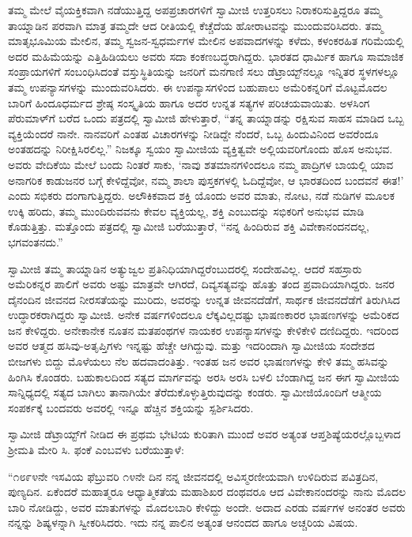 ತಮ್ಮ ಮೇಲೆ ವೈಯಕ್ತಿಕವಾಗಿ ನಡೆಯುತ್ತಿದ್ದ ಅಪಪ್ರಚಾರಗಳಿಗೆ ಸ್ವಾಮೀಜಿ ಉತ್ತರಿಸಲು ನಿರಾಕರಿಸುತ್ತಿದ್ದರೂ ತಮ್ಮ ತಾಯ್ನಾಡಿನ ಪರವಾಗಿ ಮಾತ್ರ ತಮ್ಮದೇ ಆದ ರೀತಿಯಲ್ಲಿ ಕೆಚ್ಚೆದೆಯ ಹೋರಾಟವನ್ನು ಮುಂದುವರಿಸಿದರು. ತಮ್ಮ ಮಾತೃಭೂಮಿಯ ಮೇಲಿನ, ತಮ್ಮ ಸ್ವಜನ-ಸ್ವಧರ್ಮಗಳ ಮೇಲಿನ ಅಪವಾದಗಳನ್ನು ಕಳೆದು, ಕಳಂಕರಹಿತ ಗರಿಮೆಯಲ್ಲಿ ಅದರ ಮಹಿಮೆಯನ್ನು ಎತ್ತಿಹಿಡಿಯಲು ಅವರು ಸದಾ ಕಂಕಣಬದ್ಧರಾಗಿದ್ದರು. ಭಾರತದ ಧಾರ್ಮಿಕ ಹಾಗೂ ಸಾಮಾಜಿಕ ಸಂಪ್ರಾಯಗಳಿಗೆ ಸಂಬಂಧಿಸಿದಂತೆ ವಸ್ತುಸ್ಥಿತಿಯನ್ನು ಜನರಿಗೆ ಮನಗಾಣಿ ಸಲು ಡೆಟ್ರಾಯ್ಟ್​ನಲ್ಲೂ ಇನ್ನಿತರ ಸ್ಥಳಗಳಲ್ಲೂ ತಮ್ಮ ಉಪನ್ಯಾಸಗಳನ್ನು ಮುಂದುವರಿಸಿದರು. ಈ ಉಪನ್ಯಾಸಗಳಿಂದ ಬಹುಪಾಲು ಅಮೆರಿಕನ್ನರಿಗೆ ಮೊಟ್ಟಮೊದಲ ಬಾರಿಗೆ ಹಿಂದೂಧರ್ಮದ ಶ್ರೇಷ್ಠ ಸಂಸ್ಕೃತಿಯ ಹಾಗೂ ಅದರ ಉನ್ನತ ಸತ್ಯಗಳ ಪರಿಚಯವಾಯಿತು. ಅಳಸಿಂಗ ಪೆರುಮಾಳ್​ಗೆ ಬರೆದ ಒಂದು ಪತ್ರದಲ್ಲಿ ಸ್ವಾಮೀಜಿ ಹೇಳುತ್ತಾರೆ, “ತನ್ನ ತಾಯ್ನಾಡನ್ನು ರಕ್ಷಿಸುವ ಸಾಹಸ ಮಾಡಿದ ಒಬ್ಬ ವ್ಯಕ್ತಿಯೆಂದರೆ ನಾನೇ. ನಾನವರಿಗೆ ಎಂತಹ ವಿಚಾರಗಳನ್ನು ನೀಡಿದ್ದೇ ನೆಂದರೆ, ಒಬ್ಬ ಹಿಂದುವಿನಿಂದ ಅವರೆಂದೂ ಅಂತಹದನ್ನು ನಿರೀಕ್ಷಿಸಿರಲಿಲ್ಲ.” ನಿಜಕ್ಕೂ ಸ್ವಯಂ ಸ್ವಾಮೀಜಿಯ ವ್ಯಕ್ತಿತ್ವವೇ ಅಲ್ಲಿಯವರಿಗೊಂದು ಹೊಸ ಅನುಭವ. ಅವರು ವೇದಿಕೆಯಿ ಮೇಲೆ ಬಂದು ನಿಂತರೆ ಸಾಕು, ‘ನಾವು ಶತಮಾನಗಳಿಂದಲೂ ನಮ್ಮ ಪಾದ್ರಿಗಳ ಬಾಯಲ್ಲಿ ಯಾವ ಅನಾಗರಿಕ ಕಾಡುಜನರ ಬಗ್ಗೆ ಕೇಳಿದ್ದೆವೋ, ನಮ್ಮ ಶಾಲಾ ಪುಸ್ತಕಗಳಲ್ಲಿ ಓದಿದ್ದೆವೋ, ಆ ಭಾರತದಿಂದ ಬಂದವನೆ ಈತ!’ ಎಂದು ಸಭಿಕರು ದಂಗಾಗುತ್ತಿದ್ದರು. ಅಲೌಕಿಕವಾದ ಶಕ್ತಿ ಯೊಂದು ಅವರ ಮಾತು, ನೋಟ, ನಡೆ ನುಡಿಗಳ ಮೂಲಕ ಉಕ್ಕಿ ಹರಿದು, ತಮ್ಮ ಮುಂದಿರುವವನು ಕೇವಲ ವ್ಯಕ್ತಿಯಲ್ಲ, ಶಕ್ತಿ ಎಂಬುದನ್ನು ಸಭಿಕರಿಗೆ ಅನುಭವ ಮಾಡಿ ಕೊಡುತ್ತಿತ್ತು. ಮತ್ತೊಂದು ಪತ್ರದಲ್ಲಿ ಸ್ವಾಮೀಜಿ ಬರೆಯುತ್ತಾರೆ, “ನನ್ನ ಹಿಂದಿರುವ ಶಕ್ತಿ ವಿವೇಕಾನಂದನದಲ್ಲ, ಭಗವಂತನದು.”

ಸ್ವಾಮೀಜಿ ತಮ್ಮ ತಾಯ್ನಾಡಿನ ಅತ್ಯುಜ್ವಲ ಪ್ರತಿನಿಧಿಯಾಗಿದ್ದರೆಂಬುದರಲ್ಲಿ ಸಂದೇಹವಿಲ್ಲ. ಆದರೆ ಸಹಸ್ರಾರು ಅಮೆರಿಕನ್ನರ ಪಾಲಿಗೆ ಅವರು ಅಷ್ಟು ಮಾತ್ರವೇ ಆಗಿರದೆ, ದಿವ್ಯಸತ್ಯವನ್ನು ಹೊತ್ತು ತಂದ ಪ್ರವಾದಿಯಾಗಿದ್ದರು. ಜನರ ದೈನಂದಿನ ಜೀವನದ ನೀರಸತೆಯನ್ನು ಮುರಿದು, ಅವರನ್ನು ಉನ್ನತ ಜೀವನದೆಡೆಗೆ, ಸಾರ್ಥಕ ಜೀವನದೆಡೆಗೆ ತಿರುಗಿಸಿದ ಉದ್ಧಾರಕರಾಗಿದ್ದರು ಸ್ವಾಮೀಜಿ. ಅನೇಕ ವರ್ಷಗಳಿಂದಲೂ ಲೆಕ್ಕವಿಲ್ಲದಷ್ಟು ಭಾಷಣಕಾರರ ಭಾಷಣಗಳನ್ನು ಅಮೆರಿಕದ ಜನ ಕೇಳಿದ್ದರು. ಅನೇಕಾನೇಕ ನೂತನ ಮತಪಂಥಗಳ ನಾಯಕರ ಉಪನ್ಯಾಸಗಳನ್ನು ಕೇಳಿಕೇಳಿ ದಣಿದಿದ್ದರು. ಇದರಿಂದ ಅವರ ಆತ್ಮದ ಹಸಿವು-ಅತೃಪ್ತಿಗಳು ಇನ್ನಷ್ಟು ಹೆಚ್ಚೇ ಆಗಿದ್ದುವು. ಮತ್ತು ಇದರಿಂದಾಗಿ ಸ್ವಾಮೀಜಿಯ ಸಂದೇಶದ ಬೀಜಗಳು ಬಿದ್ದು ಮೊಳೆಯಲು ನೆಲ ಹದವಾದಂತಿತ್ತು. ಇಂತಹ ಜನ ಅವರ ಭಾಷಣಗಳನ್ನು ಕೇಳಿ ತಮ್ಮ ಹಸಿವನ್ನು ಹಿಂಗಿಸಿ ಕೊಂಡರು. ಬಹುಕಾಲದಿಂದ ಸತ್ಯದ ಮಾರ್ಗವನ್ನು ಅರಸಿ ಅರಸಿ ಬಳಲಿ ಬೆಂಡಾಗಿದ್ದ ಜನ ಈಗ ಸ್ವಾಮೀಜಿಯ ಸಾನ್ನಿಧ್ಯದಲ್ಲಿ ಸತ್ಯದ ಬಾಗಿಲು ತಾನಾಗಿಯೇ ತೆರೆದುಕೊಳ್ಳುತ್ತಿರುವುದನ್ನು ಕಂಡರು. ಸ್ವಾಮೀಜಿಯೊಂದಿಗೆ ಆತ್ಮೀಯ ಸಂಪರ್ಕಕ್ಕೆ ಬಂದವರು ಅವರಲ್ಲಿ ಇನ್ನೂ ಹೆಚ್ಚಿನ ಶಕ್ತಿಯನ್ನು ಸ್ಪರ್ಶಿಸಿದರು.

ಸ್ವಾಮೀಜಿ ಡೆಟ್ರಾಯ್ಟ್​ಗೆ ನೀಡಿದ ಈ ಪ್ರಥಮ ಭೇಟಿಯ ಕುರಿತಾಗಿ ಮುಂದೆ ಅವರ ಅತ್ಯಂತ ಆಪ್ತಶಿಷ್ಯೆಯರಲ್ಲೊಬ್ಬಳಾದ ಶ್ರೀಮತಿ ಮೇರಿ ಸಿ. ಫಂಕೆ ಎಂಬವಳು ಬರೆಯುತ್ತಾಳೆ:

“೧೮೯೪ನೇ ಇಸವಿಯ ಫೆಬ್ರುವರಿ ೧೪ನೇ ದಿನ ನನ್ನ ಜೀವನದಲ್ಲಿ ಅವಿಸ್ಮರಣೀಯವಾಗಿ ಉಳಿದಿರುವ ಪವಿತ್ರದಿನ, ಪುಣ್ಯದಿನ. ಏಕೆಂದರೆ ಮಹಾತ್ಮರೂ ಆಧ್ಯಾತ್ಮಿಕತೆಯ ಮಹಾಶಿಖರ ದಂಥವರೂ ಆದ ವಿವೇಕಾನಂದರನ್ನು ನಾನು ಮೊದಲ ಬಾರಿ ನೋಡಿದ್ದು, ಅವರ ಮಾತುಗಳನ್ನು ಮೊದಲಬಾರಿ ಕೇಳಿದ್ದು ಅಂದೇ. ಅದಾದ ಎರಡು ವರ್ಷಗಳ ಅನಂತರ ಅವರು ನನ್ನನ್ನು ಶಿಷ್ಯಳನ್ನಾಗಿ ಸ್ವೀಕರಿಸಿದರು. ಇದು ನನ್ನ ಪಾಲಿನ ಅತ್ಯಂತ ಆನಂದದ ಹಾಗೂ ಅಚ್ಚರಿಯ ವಿಷಯ.


